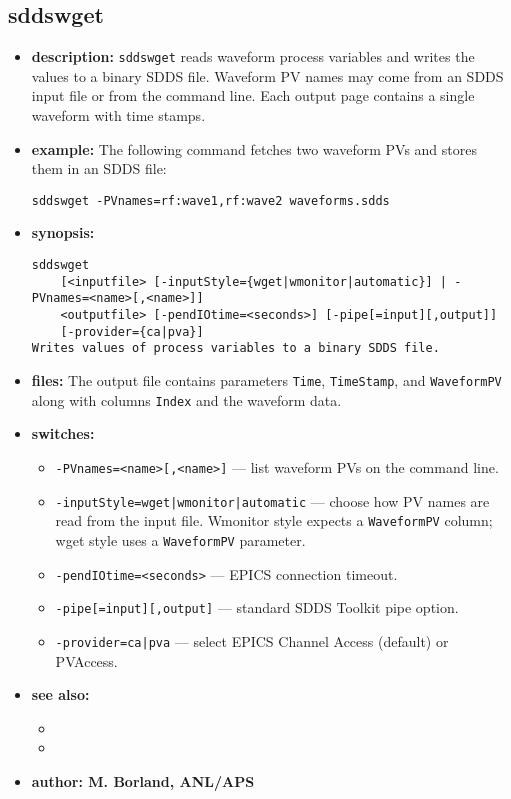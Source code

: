\begin{latexonly}
\newpage
\end{latexonly}

\subsection{sddswget}
\label{sddswget}

\begin{itemize}
\item {\bf description:}
\verb+sddswget+ reads waveform process variables and writes the values to a binary SDDS file.  Waveform PV names may come from an SDDS input file or from the command line.  Each output page contains a single waveform with time stamps.

\item {\bf example:}
The following command fetches two waveform PVs and stores them in an SDDS file:
\begin{verbatim}
sddswget -PVnames=rf:wave1,rf:wave2 waveforms.sdds
\end{verbatim}

\item {\bf synopsis:}
\begin{verbatim}
sddswget
    [<inputfile> [-inputStyle={wget|wmonitor|automatic}] | -PVnames=<name>[,<name>]]
    <outputfile> [-pendIOtime=<seconds>] [-pipe[=input][,output]]
    [-provider={ca|pva}]
Writes values of process variables to a binary SDDS file.
\end{verbatim}

\item {\bf files:}
The output file contains parameters \verb+Time+, \verb+TimeStamp+, and \verb+WaveformPV+ along with columns \verb+Index+ and the waveform data.

\item {\bf switches:}
    \begin{itemize}
        \item {\tt -PVnames=<name>[,<name>]} --- list waveform PVs on the command line.
        \item {\tt -inputStyle={wget|wmonitor|automatic}} --- choose how PV names are read from the input file.  Wmonitor style expects a \verb+WaveformPV+ column; wget style uses a \verb+WaveformPV+ parameter.
        \item {\tt -pendIOtime=<seconds>} --- EPICS connection timeout.
        \item {\tt -pipe[=input][,output]} --- standard SDDS Toolkit pipe option.
        \item {\tt -provider={ca|pva}} --- select EPICS Channel Access (default) or PVAccess.
    \end{itemize}

\item {\bf see also:}
    \begin{itemize}
        \item {}
        \item {}
    \end{itemize}

\item {\bf author: M. Borland, ANL/APS}
\end{itemize}
